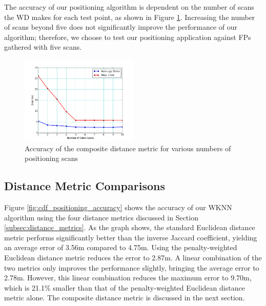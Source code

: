 \documentclass[conference]{IEEEtran}
\begin{document}
The accuracy of our positioning algorithm is dependent on the number of scans the WD makes for each test point, as shown in Figure \ref{fig:composite_accuracy}. Increasing the number of scans beyond five does not significantly improve the performance of our algorithm; therefore, we choose to test our positioning application against FPs gathered with five scans.

\begin{figure}[t!]
  \centering
    \includegraphics[width=0.5\textwidth]{pull_errors.png}
   \caption{Accuracy of the composite distance metric for various numbers of positioning scans}
   \label{fig:composite_accuracy}
\end{figure}

\subsection{Distance Metric Comparisons}
Figure \ref{fig:cdf_positioning_accuracy} shows the accuracy of our WKNN algorithm using the four distance metrics discussed in Section \ref{subsec:distance_metrics}. As the graph shows, the standard Euclidean distance metric performs significantly better than the inverse Jaccard coefficient, yielding an average error of 3.56m compared to 4.75m. Using the penalty-weighted Euclidean distance metric reduces the error to 2.87m. A linear combination of the two metrics only improves the performance slightly, bringing the average error to 2.78m. However, this linear combination reduces the maximum error to 9.70m, which is 21.1\% smaller than that of the penalty-weighted Euclidean distance metric alone. The composite distance metric is discussed in the next section.
\end{document}
